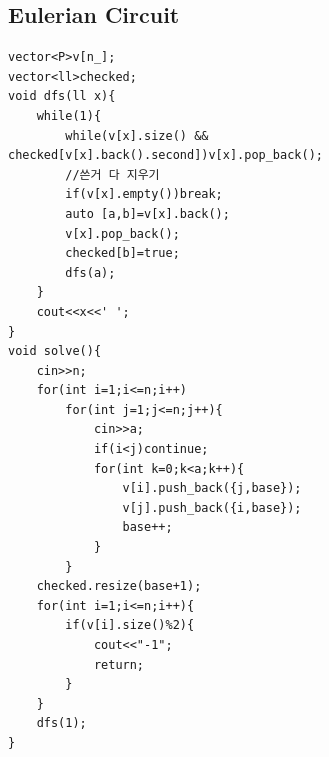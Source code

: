 \documentclass[landscape, 8pt, a4paper, oneside, twocolumn]{extarticle}
\begin{document}
\subsection {Eulerian Circuit}
\begin{verbatim}
vector<P>v[n_];
vector<ll>checked;
void dfs(ll x){
    while(1){
        while(v[x].size() && checked[v[x].back().second])v[x].pop_back();
        //쓴거 다 지우기
        if(v[x].empty())break;
        auto [a,b]=v[x].back();
        v[x].pop_back();
        checked[b]=true;
        dfs(a);
    }
    cout<<x<<' ';
}
void solve(){
    cin>>n;
    for(int i=1;i<=n;i++)
        for(int j=1;j<=n;j++){
            cin>>a;
            if(i<j)continue;
            for(int k=0;k<a;k++){
                v[i].push_back({j,base});
                v[j].push_back({i,base});
                base++;
            }
        }
    checked.resize(base+1);
    for(int i=1;i<=n;i++){
        if(v[i].size()%2){
            cout<<"-1";
            return;
        }
    }
    dfs(1);
}

\end{verbatim}
\end{document}
